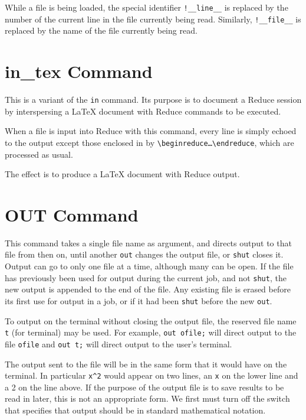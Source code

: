 While a file is being loaded, the special identifier
\texttt{!\_\_line\_\_}
is replaced by the number of the current line in the file currently
being read.
Similarly, \texttt{!\_\_file\_\_}
is replaced by the name of the file currently
being read.

\section{in\_tex Command}
\hypertarget{command:IN_TEX}{}

This is a variant of the \texttt{in} command. Its purpose is to document a Reduce session
by interspersing a \LaTeX{} document with Reduce commands to be executed.

When a file is input into Reduce with this command, every line is simply echoed to the output
except those enclosed in by
\texttt{\textbackslash begin\textbraceleft reduce\textbraceright\ldots\textbackslash end\textbraceleft reduce\textbraceright},
which are processed as usual.

The effect is to produce a \LaTeX{} document with Reduce output.


\section{OUT Command}
\hypertarget{command:OUT}{}
This command takes a single file name as argument, and directs output to
that file from then on, until another \texttt{out} changes the output file,
or \texttt{shut} closes it.  Output can go to only one file at a time,
although many can be open.  If the file has previously been used for
output during the current job, and not \texttt{shut}, the new
output is appended to the end of the file.  Any existing file is erased
before its first use for output in a job, or if it had been \texttt{shut}
before the new \texttt{out}.

To output on the terminal without closing the output file, the reserved
file name \texttt{t} (for terminal) may be used.  For example,
\texttt{out ofile;} will direct output to the file \texttt{ofile} and
\texttt{out t;} will direct output to the user's terminal.

The output sent to the file will be in the same form that it would have on
the terminal.  In particular \texttt{x\textasciicircum 2} would appear
on two lines, an
\texttt{x} on the lower line and a 2 on the line above.  If the purpose of the
output file is to save results to be read in later, this is not an
appropriate form.  We first must turn off the  switch that
specifies that output should be in standard mathematical notation.

